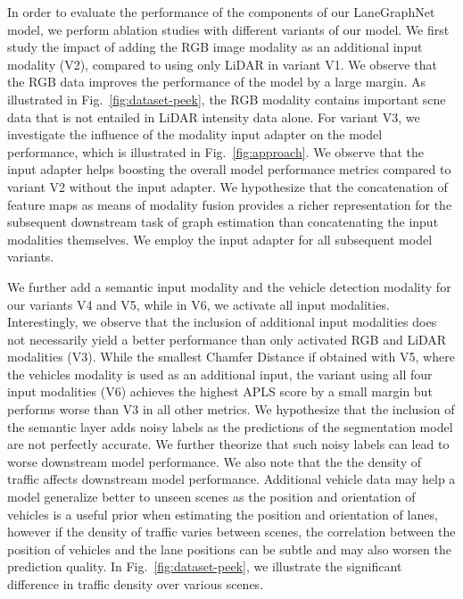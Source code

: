 \documentclass[letterpaper, 10 pt, conference]{ieeeconf}
\begin{document}
In order to evaluate the performance of the components of our LaneGraphNet model, we perform ablation studies with different variants of our model. 
We first study the impact of adding the RGB image modality as an additional input modality (V2), compared to using only LiDAR in variant V1. We observe that the RGB data improves the performance of the model by a large margin. As illustrated in Fig.~\ref{fig:dataset-peek}, the RGB modality contains important scne data that is not entailed in LiDAR intensity data alone. For variant V3, we investigate the influence of the modality input adapter on the model performance, which is illustrated in Fig.~\ref{fig:approach}. We observe that the input adapter helps boosting the overall model performance metrics compared to variant V2 without the input adapter. We hypothesize that the concatenation of feature maps as means of modality fusion provides a richer representation for the subsequent downstream task of graph estimation than concatenating the input modalities themselves. We employ the input adapter for all subsequent model variants.



We further add a semantic input modality and the vehicle detection modality for our variants V4 and V5, while in V6, we activate all input modalities. Interestingly, we observe that the inclusion of additional input modalities does not necessarily yield a better performance than only activated RGB and LiDAR modalities (V3). While the smallest Chamfer Distance if obtained with V5, where the vehicles modality is used as an additional input, the variant using all four input modalities (V6) achieves the highest APLS score by a small margin but performs worse than V3 in all other metrics. We hypothesize that the inclusion of the semantic layer adds noisy labels as the predictions of the segmentation model are not perfectly accurate. We further theorize that such noisy labels can lead to worse downstream model performance. We also note that the the density of traffic affects downstream model performance. Additional vehicle data may help a model generalize better to unseen scenes as the position and orientation of vehicles is a useful prior when estimating the position and orientation of lanes, however if the density of traffic varies between scenes, the correlation between the position of vehicles and the lane positions can be subtle and may also worsen the prediction quality. In Fig.~\ref{fig:dataset-peek}, we illustrate the significant difference in traffic density over various scenes.
\end{document}
